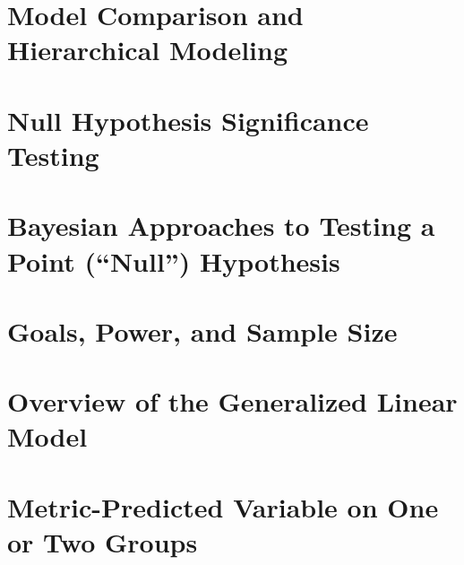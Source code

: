 \documentclass[
  letterpaper,
  DIV=11,
  numbers=noendperiod]{scrreprt}
\begin{document}

\hypertarget{model-comparison-and-hierarchical-modeling}{%
\chapter{Model Comparison and Hierarchical
Modeling}\label{model-comparison-and-hierarchical-modeling}}


\hypertarget{null-hypothesis-significance-testing}{%
\chapter{Null Hypothesis Significance
Testing}\label{null-hypothesis-significance-testing}}


\hypertarget{bayesian-approaches-to-testing-a-point-null-hypothesis}{%
\chapter{Bayesian Approaches to Testing a Point (``Null'')
Hypothesis}\label{bayesian-approaches-to-testing-a-point-null-hypothesis}}


\hypertarget{goals-power-and-sample-size}{%
\chapter{Goals, Power, and Sample
Size}\label{goals-power-and-sample-size}}


\hypertarget{overview-of-the-generalized-linear-model}{%
\chapter{Overview of the Generalized Linear
Model}\label{overview-of-the-generalized-linear-model}}


\hypertarget{metric-predicted-variable-on-one-or-two-groups}{%
\chapter{Metric-Predicted Variable on One or Two
Groups}\label{metric-predicted-variable-on-one-or-two-groups}}

\end{document}
